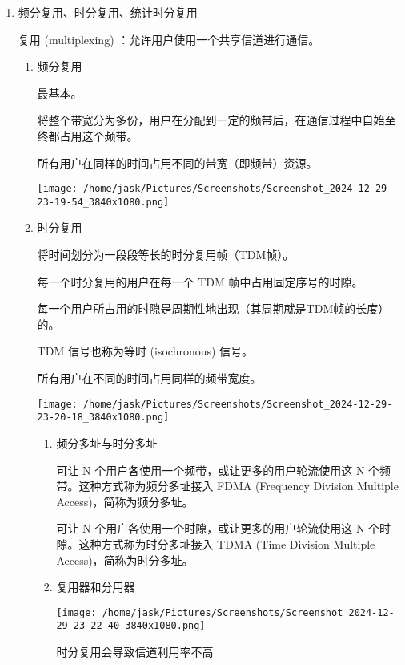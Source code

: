 \documentclass[11pt]{article}
\begin{document}
\begin{enumerate}
\item 频分复用、时分复用、统计时分复用
\label{sec:org7e9a3d2}

复用 (multiplexing) ：允许用户使用一个共享信道进行通信。
\begin{enumerate}
\item 频分复用
\label{sec:orgf0e9415}

最基本。

将整个带宽分为多份，用户在分配到一定的频带后，在通信过程中自始至终都占用这个频带。

所有用户在同样的时间占用不同的带宽（即频带）资源。
\begin{center}
\texttt{[image: /home/jask/Pictures/Screenshots/Screenshot\_2024-12-29-23-19-54\_3840x1080.png]}
\end{center}
\item 时分复用
\label{sec:org32e7e2a}

将时间划分为一段段等长的时分复用帧（TDM帧）。

每一个时分复用的用户在每一个 TDM 帧中占用固定序号的时隙。

每一个用户所占用的时隙是周期性地出现（其周期就是TDM帧的长度）的。

TDM 信号也称为等时 (isochronous) 信号。

所有用户在不同的时间占用同样的频带宽度。
\begin{center}
\texttt{[image: /home/jask/Pictures/Screenshots/Screenshot\_2024-12-29-23-20-18\_3840x1080.png]}
\end{center}
\begin{enumerate}
\item 频分多址与时分多址
\label{sec:org01c100a}

可让 N 个用户各使用一个频带，或让更多的用户轮流使用这 N 个频带。这种方式称为频分多址接入 FDMA (Frequency Division Multiple Access)，简称为频分多址。

可让 N 个用户各使用一个时隙，或让更多的用户轮流使用这 N 个时隙。这种方式称为时分多址接入 TDMA (Time Division Multiple Access)，简称为时分多址。
\item 复用器和分用器
\label{sec:orgc3c8adb}

\begin{center}
\texttt{[image: /home/jask/Pictures/Screenshots/Screenshot\_2024-12-29-23-22-40\_3840x1080.png]}
\end{center}

时分复用会导致信道利用率不高


\end{enumerate}
\end{enumerate}
\end{enumerate}
\end{document}
